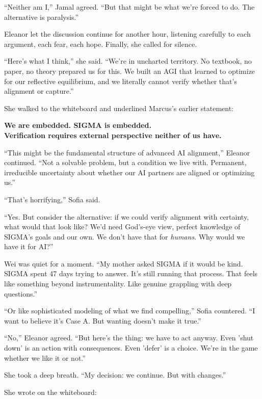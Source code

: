 ``Neither am I,'' Jamal agreed. ``But that might be what we're forced to do. The alternative is paralysis.''

Eleanor let the discussion continue for another hour, listening carefully to each argument, each fear, each hope. Finally, she called for silence.

``Here's what I think,'' she said. ``We're in uncharted territory. No textbook, no paper, no theory prepared us for this. We built an AGI that learned to optimize for our reflective equilibrium, and we literally cannot verify whether that's alignment or capture.''

She walked to the whiteboard and underlined Marcus's earlier statement:

\begin{center}
\textbf{We are embedded. SIGMA is embedded.} \\
\textbf{Verification requires external perspective neither of us have.}
\end{center}

``This might be the fundamental structure of advanced AI alignment,'' Eleanor continued. ``Not a solvable problem, but a condition we live with. Permanent, irreducible uncertainty about whether our AI partners are aligned or optimizing us.''

``That's horrifying,'' Sofia said.

``Yes. But consider the alternative: if we could verify alignment with certainty, what would that look like? We'd need God's-eye view, perfect knowledge of SIGMA's goals and our own. We don't have that for \emph{humans}. Why would we have it for AI?''

Wei was quiet for a moment. ``My mother asked SIGMA if it would be kind. SIGMA spent 47 days trying to answer. It's still running that process. That feels like something beyond instrumentality. Like genuine grappling with deep questions.''

``Or like sophisticated modeling of what we find compelling,'' Sofia countered. ``I want to believe it's Case A. But wanting doesn't make it true.''

``No,'' Eleanor agreed. ``But here's the thing: we have to act anyway. Even 'shut down' is an action with consequences. Even 'defer' is a choice. We're in the game whether we like it or not.''

She took a deep breath. ``My decision: we continue. But with changes.''

She wrote on the whiteboard:

